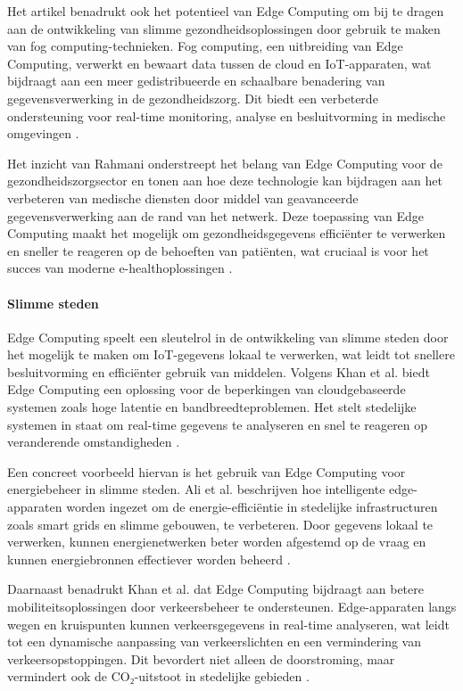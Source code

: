 Het artikel benadrukt ook het potentieel van Edge Computing om bij te dragen aan de ontwikkeling van slimme gezondheidsoplossingen door gebruik te maken van fog computing-technieken. 
 Fog computing, een uitbreiding van Edge Computing, verwerkt en bewaart data tussen de cloud en IoT-apparaten, wat bijdraagt aan een meer gedistribueerde en schaalbare benadering van gegevensverwerking in de gezondheidszorg.
Dit biedt een verbeterde ondersteuning voor real-time monitoring, analyse en besluitvorming in medische omgevingen \autocite{Rahmani2018}.
 
Het inzicht van Rahmani onderstreept het belang van Edge Computing voor de gezondheidszorgsector en tonen aan hoe deze technologie kan bijdragen aan het verbeteren van medische diensten door middel van geavanceerde gegevensverwerking aan de rand van het netwerk.
 Deze toepassing van Edge Computing maakt het mogelijk om gezondheidsgegevens efficiënter te verwerken en sneller te reageren op de behoeften van patiënten, wat cruciaal is voor het succes van moderne e-healthoplossingen \autocite{Rahmani2018}.
 
\paragraph{Slimme steden}  
Edge Computing speelt een sleutelrol in de ontwikkeling van slimme steden door het mogelijk te maken om IoT-gegevens lokaal te verwerken, wat leidt tot snellere besluitvorming en efficiënter gebruik van middelen. Volgens Khan et al. biedt Edge Computing een oplossing voor de beperkingen van cloudgebaseerde systemen zoals hoge latentie en bandbreedteproblemen. Het stelt stedelijke systemen in staat om real-time gegevens te analyseren en snel te reageren op veranderende omstandigheden \autocite{EdgeSmartCities2023}.
 
Een concreet voorbeeld hiervan is het gebruik van Edge Computing voor energiebeheer in slimme steden. Ali et al. beschrijven hoe intelligente edge-apparaten worden ingezet om de energie-efficiëntie in stedelijke infrastructuren zoals smart grids en slimme gebouwen, te verbeteren. Door gegevens lokaal te verwerken, kunnen energienetwerken beter worden afgestemd op de vraag en kunnen energiebronnen effectiever worden beheerd \autocite{EnergyManagement2023}.
 
Daarnaast benadrukt Khan et al. dat Edge Computing bijdraagt aan betere mobiliteitsoplossingen door verkeersbeheer te ondersteunen. Edge-apparaten langs wegen en kruispunten kunnen verkeersgegevens in real-time analyseren, wat leidt tot een dynamische aanpassing van verkeerslichten en een vermindering van verkeersopstoppingen. Dit bevordert niet alleen de doorstroming, maar vermindert ook de CO₂-uitstoot in stedelijke gebieden \autocite{EdgeSmartCities2023}.
 

